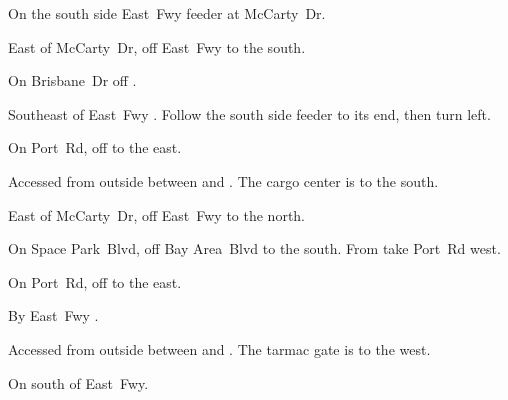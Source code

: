 

\begin{LocationList}

On the south side  East~Fwy feeder at McCarty~Dr.

\Location{\GarageHQ \Garage}
East of McCarty~Dr, off  East~Fwy to the south.

On Brisbane~Dr off .

Southeast of  East~Fwy .
Follow the south side feeder to its end, then turn left.

On Port~Rd, off  to the east.

Accessed from  outside  between  and .
The cargo center is to the south.

\Location{\RecruitmentAgency \Recruitment}
East of McCarty~Dr, off  East~Fwy to the north.

On Space Park~Blvd, off Bay Area~Blvd to the south.
From  take Port~Rd west.

On Port~Rd, off  to the east.

\Location{\TruckStop \Gas \Rest \Weigh}
By  East~Fwy .

Accessed from  outside  between  and .
The tarmac gate is to the west.

On  south of  East~Fwy.

\end{LocationList}
